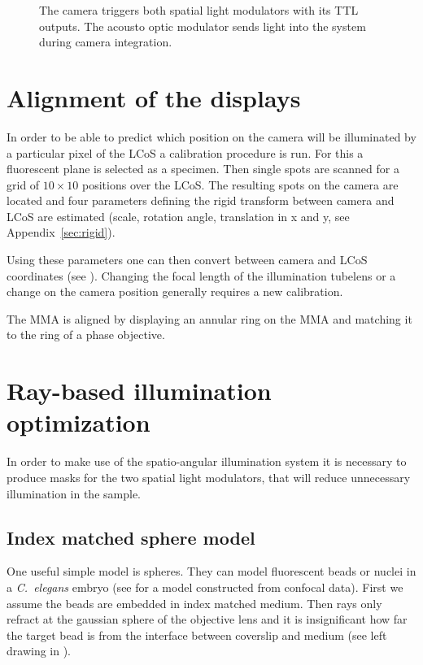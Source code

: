 \begin{figure}[!hbt]
  \centering
  
  \caption{The camera triggers both spatial light modulators with its
    TTL outputs. The acousto optic modulator sends light into the
    system during camera integration.}
  \label{fig:memi-electronics}
\end{figure}

\section{Alignment of the displays}

In order to be able to predict which position on the camera will be
illuminated by a particular pixel of the LCoS a calibration procedure
is run. For this a fluorescent plane is selected as a specimen. Then
single spots are scanned for a grid of $10\times10$ positions over the
LCoS. The resulting spots on the camera are located and four
parameters defining the rigid transform between camera and LCoS are
estimated (scale, rotation angle, translation in x and y, see
Appendix~\ref{sec:rigid}).

Using these parameters one can then convert between camera and LCoS
coordinates (see ). Changing the focal
length of the illumination tubelens or a change on the camera position
generally requires a new calibration.


The MMA is aligned by displaying an annular ring on the MMA and
matching it to the ring of a phase objective.


\section{Ray-based illumination optimization}
In order to make use of the spatio-angular illumination system it is
necessary to produce masks for the two spatial light modulators, that
will reduce unnecessary illumination in the sample.

\subsection{Index matched sphere model}
\label{sec:shadow-map}
One useful simple model is spheres. They can model fluorescent beads
or nuclei in a \emph{C.~elegans} embryo (see  for a
model constructed from confocal data). First we assume the beads are
embedded in index matched medium. Then rays only refract at the
gaussian sphere of the objective lens and it is insignificant how far
the target bead is from the interface between coverslip and medium
(see left drawing in ).

